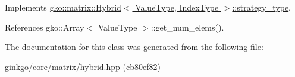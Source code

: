 Implements \hyperlink{classgko_1_1matrix_1_1Hybrid_1_1strategy__type_a0a0cd4024f27c7d0f286f35fc0a6de60}{gko\+::matrix\+::\+Hybrid$<$ Value\+Type, Index\+Type $>$\+::strategy\+\_\+type}.



References gko\+::\+Array$<$ Value\+Type $>$\+::get\+\_\+num\+\_\+elems().



The documentation for this class was generated from the following file\+:\begin{DoxyCompactItemize}
\item 
ginkgo/core/matrix/hybrid.\+hpp (cb80ef82)\end{DoxyCompactItemize}
